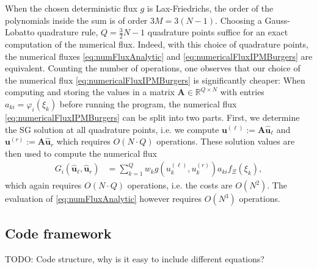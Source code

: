 When the chosen deterministic flux $g$ is Lax-Friedrichs, the order of the polynomials inside the sum is of order $3M=3(N-1)$. Choosing a Gauss-Lobatto quadrature rule, $Q = \frac32 N -1$ quadrature points suffice for an exact computation of the numerical flux. Indeed, with this choice of quadrature points, the numerical fluxes \eqref{eq:numFluxAnalytic} and \eqref{eq:numericalFluxIPMBurgers} are equivalent. 
Counting the number of operations, one observes that our choice of the numerical flux \eqref{eq:numericalFluxIPMBurgers} is significantly cheaper: When computing and storing the values in a matrix $\bm A\in\mathbb{R}^{Q\times N}$ with entries $a_{ki} = \varphi_i(\xi_k)$ before running the program, the numerical flux \eqref{eq:numericalFluxIPMBurgers} can be split into two parts. First, we determine the SG solution at all quadrature points, i.e. we compute $\bm{u}^{(\ell)} := \bm A \bm{\hat u}_{\ell}$ and $\bm{u}^{(r)} := \bm A \bm{\hat u}_{r}$ which requires $O(N\cdot Q)$ operations. These solution values are then used to compute the numerical flux
\begin{align*}
G_i(\bm{\hat u}_{\ell},\bm{\hat u}_{r}) &= \sum_{k=1}^Q w_k g(u^{(\ell)}_k,u^{(r)}_k)a_{ki}f_{\Xi}(\xi_k),
\end{align*}
which again requires $O(N\cdot Q)$ operations, i.e. the costs are $O(N^2)$. The evaluation of \eqref{eq:numFluxAnalytic} however requires $O(N^3)$ operations.

\subsection{Code framework}

TODO: Code structure, why is it easy to include different equations?